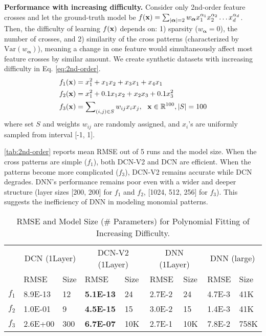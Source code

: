 \documentclass[sigconf]{acmart}
\newcommand{\vecx}{{\bf x}}
\newcommand{\vecalpha}{{\bm \alpha}}
\newcommand{\Var}{\mathrm{Var}}
\begin{document}
{\bf Performance with increasing difficulty.}
Consider only 2nd-order feature crosses and let the ground-truth model be $f(\vecx) = \sum_{|\vecalpha|=2} w_{\vecalpha} x_1^{\alpha_1}x_2^{\alpha_2}\ldots x_d^{\alpha_d}$.
Then, the difficulty of learning $f(\vecx)$ depends on: 1) sparsity ($w_{\vecalpha}=0$), the number of crosses, and 2) similarity of the cross patterns (characterized by $\Var(w_{\vecalpha})$), meaning a change in one feature would simultaneously affect most feature crosses by similar amount. We create synthetic datasets with increasing difficulty in Eq. \eqref{eq:2nd-order}.
\begin{equation}
    \label{eq:2nd-order}
    \begin{split}
    f_1(\vecx) &= x_1^2+x_1x_2+x_3x_1+x_4x_1 \\
    f_2(\vecx) &= x_1^2+0.1x_1x_2+x_2x_3+0.1x_3^2 \\
    f_3(\vecx) &= \sum\nolimits_{(i,j) \in S} w_{ij} x_i x_j, ~~\vecx \in \mathbb{R}^{100}, |S|=100
    \end{split}
\end{equation}
where set $S$ and weights $w_{ij}$ are randomly assigned, and $x_i$'s are uniformly sampled from interval [-1, 1].

\autoref{tab:2nd-order} reports mean RMSE out of 5 runs and the model size. When the cross patterns are simple ($f_1$), both {DCN-V2} and DCN are efficient. When the patterns become more complicated ($f_3$), {DCN-V2} remains accurate while DCN degrades. DNN's performance remains poor even with a wider and deeper structure (layer sizes [200, 200] for $f_1$ and $f_2$, [1024, 512, 256] for $f_3$). This suggests the inefficiency of DNN in modeling monomial patterns. 

\begin{table}[htpb]
\footnotesize
\vspace{-5pt}
\caption{RMSE and Model Size (\# Parameters) for Polynomial Fitting of Increasing Difficulty.}
\vspace{-3.5ex}
\label{tab:2nd-order}
\begin{center}
\begin{tabular}{c|ll|ll|ll|ll}
\toprule
& \multicolumn{2}{c|}{DCN (1Layer)}  & \multicolumn{2}{c|}{DCN-V2 (1Layer)}  & \multicolumn{2}{c|}{DNN (1Layer)} & \multicolumn{2}{c}{DNN (large)}\\
& RMSE & Size & RMSE & Size & RMSE & Size & RMSE & Size \\
\midrule
$f_1$& 8.9E-13 & 12 & {\bf 5.1E-13} & 24 & 2.7E-2 & 24  & 4.7E-3 & 41K 
\\
$f_2$ & 1.0E-01 & 9  & {\bf 4.5E-15} & 15 & 3.0E-2 & 15 & 1.4E-3 & 41K\\
$f_3$ & 2.6E+00 & 300 & {\bf 6.7E-07} & 10K & 2.7E-1 & 10K & 7.8E-2 & 758K\\
\bottomrule
\end{tabular}
\end{center}
\vspace{-5pt}
\end{table}
\end{document}
